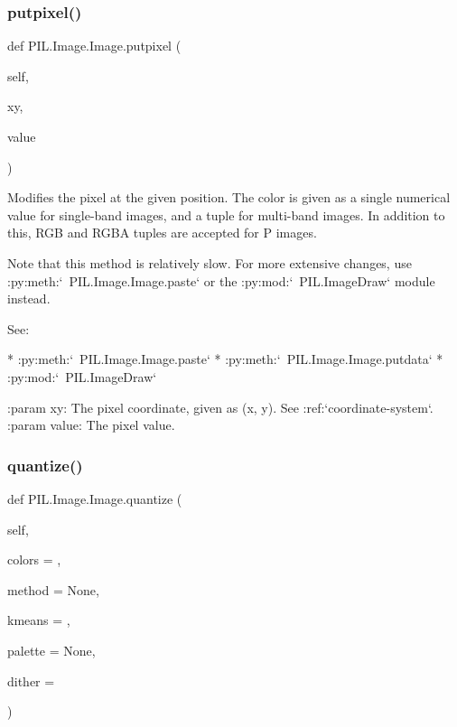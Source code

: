 \subsubsection{\texorpdfstring{putpixel()}{putpixel()}}
{\footnotesize\ttfamily def P\+I\+L.\+Image.\+Image.\+putpixel (\begin{DoxyParamCaption}\item[{}]{self,  }\item[{}]{xy,  }\item[{}]{value }\end{DoxyParamCaption})}

\begin{DoxyVerb}Modifies the pixel at the given position. The color is given as
a single numerical value for single-band images, and a tuple for
multi-band images. In addition to this, RGB and RGBA tuples are
accepted for P images.

Note that this method is relatively slow.  For more extensive changes,
use :py:meth:`~PIL.Image.Image.paste` or the :py:mod:`~PIL.ImageDraw`
module instead.

See:

* :py:meth:`~PIL.Image.Image.paste`
* :py:meth:`~PIL.Image.Image.putdata`
* :py:mod:`~PIL.ImageDraw`

:param xy: The pixel coordinate, given as (x, y). See
   :ref:`coordinate-system`.
:param value: The pixel value.
\end{DoxyVerb}
 \mbox{\label{classPIL_1_1Image_1_1Image_a3eabb1df6adc8a8c89a4bc1f0ae784e7}} 
\subsubsection{\texorpdfstring{quantize()}{quantize()}}
{\footnotesize\ttfamily def P\+I\+L.\+Image.\+Image.\+quantize (\begin{DoxyParamCaption}\item[{}]{self,  }\item[{}]{colors = {},  }\item[{}]{method = {\ttfamily None},  }\item[{}]{kmeans = {},  }\item[{}]{palette = {\ttfamily None},  }\item[{}]{dither = {} }\end{DoxyParamCaption})}

